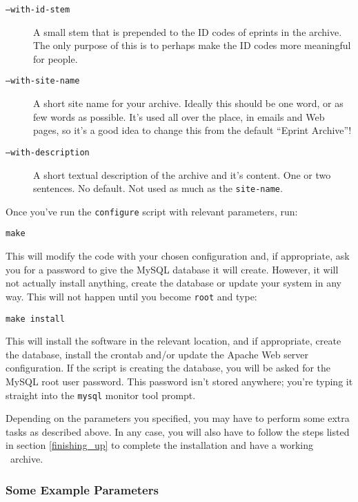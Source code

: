 \begin{description}
\item[{\tt --with-id-stem}]

A small stem that is prepended to the ID codes of eprints in the archive. The only purpose of this is to perhaps make the ID codes more meaningful for people.

\item[{\tt --with-site-name}]

A short site name for your archive. Ideally this should be one word, or as few words as possible. It's used all over the place, in emails and Web pages, so it's a good idea to change this from the default ``Eprint Archive''!

\item[{\tt --with-description}]

A short textual description of the archive and it's content. One or two sentences. No default. Not used as much as the {\tt site-name}.

\end{description}

Once you've run the {\tt configure} script with relevant parameters, run:

\begin{verbatim}
make
\end{verbatim}

This will modify the code with your chosen configuration and, if appropriate, ask you for a password to give the MySQL database it will create. However, it will not actually install anything, create the database or update your system in any way. This will not happen until you become {\tt root} and type:

\begin{verbatim}
make install
\end{verbatim}

This will install the software in the relevant location, and if appropriate, create the database, install the crontab and/or update the Apache Web server configuration. If the script is creating the database, you will be asked for the MySQL root user password. This password isn't stored anywhere; you're typing it straight into the {\tt mysql} monitor tool prompt.

Depending on the parameters you specified, you may have to perform some extra tasks as described above. In any case, you will also have to follow the steps listed in section \ref{finishing_up} to complete the installation and have a working \eprints\ archive.


\subsubsection{Some Example Parameters}
\label{example_conf_params}

